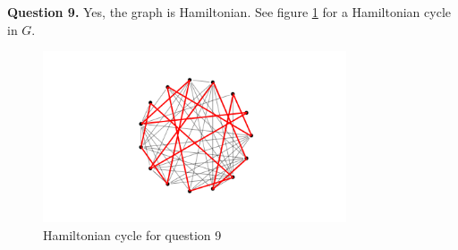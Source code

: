 \documentclass[letterpaper, reqno,11pt]{article}
\begin{document}
{\medskip\noindent\bf Question 9.} Yes, the graph is Hamiltonian. See figure \ref{fig:q9} for a Hamiltonian cycle in $G$.

\begin{figure}[htpb]
    \centering
    \includegraphics[width=0.8\textwidth]{q9}
    \caption{Hamiltonian cycle for question 9}
    \label{fig:q9}
\end{figure}
\end{document}
